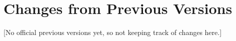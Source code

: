 \documentclass[11pt,a4paper]{ivoa}
\begin{document}
\appendix
\section{Changes from Previous Versions}
[No official previous versions yet, so not keeping track of changes here.]



\end{document}
